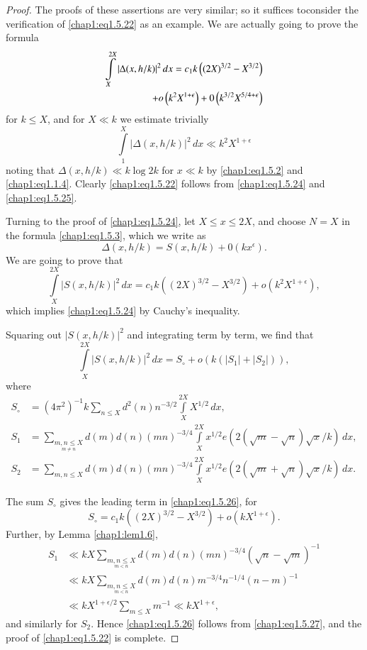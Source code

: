 \begin{proof}
The proofs of these assertions are very similar; so it suffices
to\pageoriginale consider the verification of \eqref{chap1:eq1.5.22}
as an example. We are actually going to prove the formula
\begin{align}
\int\limits_X^{2X}|\Delta(x,h/k)|^2 \,dx=c_1k\left((2X)^{3/2}
-X^{3/2}\right)\label{chap1:eq1.5.24} &\\
+o\left(k^2X^{1+\epsilon}\right)+0\left(k^{3/2}X^{5/4+\epsilon}\right)&\notag
\end{align}
for $k\leq X$, and for $X\ll k$ we estimate trivially
\begin{equation}\label{chap1:eq1.5.25}
\int\limits_1^X|\Delta(x,h/k)|^2\,dx\ll k^2X^{1+\epsilon}
\end{equation}
noting that $\Delta(x,h/k)\ll k\log 2k$ for $x\ll k$ by
\eqref{chap1:eq1.5.2} and \eqref{chap1:eq1.1.4}. Clearly
\eqref{chap1:eq1.5.22} follows from \eqref{chap1:eq1.5.24} and
\eqref{chap1:eq1.5.25}.

Turning to the proof of \eqref{chap1:eq1.5.24}, let $X\leq x\leq 2X$,
and choose $N=X$ in the formula \eqref{chap1:eq1.5.3}, which we write
as 
$$
\Delta(x,h/k)=S(x,h/k)+0(kx^\epsilon).
$$
We are going to prove that 
\begin{equation}\label{chap1:eq1.5.26}
\int\limits_X^{2X}|S(x,h/k)|^2 \,dx=c_1k\left((2X)^{3/2}-X
^{3/2}\right)+o\left(k^2X^{1+\epsilon}\right),
\end{equation}
which implies \eqref{chap1:eq1.5.24} by Cauchy's inequality.

Squaring out $|S(x,h/k)|^2$ and integrating term by term, we find that 
\begin{equation}\label{chap1:eq1.5.27}
\int\limits_X^{2X}|S(x,h/k)|^2\,dx=S_\circ+o(k(|S_1|+|S_2|)),
\end{equation}
where
\begin{align*}
S_\circ &= (4\pi^2)^{-1}k\sum\limits_{n\leq X} d^2(n)n^{-3/2}
\int\limits_X^{2X}X^{1/2}\,dx,\\
S_1 &= \sum\limits_{\underset{m\neq n}{m,n\leq X}}d(m)d(n)(mn)^{-3/4}
\int\limits_X^{2X}x^{1/2}e(2(\sqrt{m}-\sqrt{n})\sqrt{x}/k)\,dx,\\
S_2 &= \sum\limits_{m,n\leq X}d(m)d(n)(mn)^{-3/4} \int\limits_X^{2X}
x^{1/2}e\left(2\left(\sqrt{m}+\sqrt{n}\right)\sqrt{x}/k\right)\,dx.
\end{align*}\pageoriginale

The sum $S_\circ$ gives the leading term in \eqref{chap1:eq1.5.26},
for 
$$
S_\circ =c_1k\left((2X)^{3/2}-X^{3/2}\right)
+o\left(kX^{1+\epsilon}\right).
$$
Further, by Lemma \ref{chap1:lem1.6},
\begin{align*}
S_1 &\ll kX\sum\limits_{\underset{m<n}{m,n\leq X}}d(m)d(n)(mn)^{-3/4}
\left(\sqrt{n}-\sqrt{m}\right)^{-1}\\
&\ll kX\sum\limits_{\underset{m<n}{m,n\leq X}}d(m)d(n)m^{-3/4}
n^{-1/4}(n-m)^{-1}\\
&\ll kX^{1+\epsilon/2}\sum\limits_{m\leq X}m^{-1}\ll kX^{1+\epsilon},
\end{align*}
and similarly for $S_2$. Hence \eqref{chap1:eq1.5.26} follows from
\eqref{chap1:eq1.5.27}, and the proof of \eqref{chap1:eq1.5.22} is
complete. 
\end{proof}

